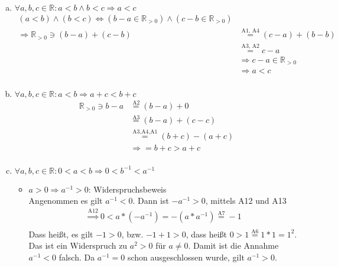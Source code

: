 \documentclass{article}
\begin{document}
\begin{enumerate}[(a)]
\item $\forall a,b,c \in \mathbb{R} \colon a < b \land b < c \Rightarrow a < c$ \\
  \begin{align*}
    (a < b) \land (b < c) \iff (b - a \in \mathbb{R}_{>0}) \land (c - b \in \mathbb{R}_{>0}) \\
    \Rightarrow \mathbb{R}_{>0} \ni (b - a) + (c - b) & \overset{\text{A1, A4}}= (c - a) + (b - b) \\
                                                      &  \overset{\text{A3, A2}}= c - a \\
                                                      & \Rightarrow c - a \in \mathbb{R}_{>0} \\
                                                      & \Rightarrow a < c\\
  \end{align*}
\item $\forall a,b,c \in \mathbb{R} \colon a < b \Rightarrow a + c < b + c$ \\
  \begin{align*}
    \mathbb{R}_{>0} \ni b - a &\overset{\text{A2}}= (b - a) + 0 \\
                              &\overset{\text{A3}}= (b - a) + (c - c) \\ 
                              &\overset{\text{A3,A4,A1}}= (b + c) - (a + c) \\
                              &\Rightarrow= b + c > a + c \\
  \end{align*}
\item $\forall a,b,c \in \mathbb{R} \colon 0 < a < b \Rightarrow 0 < b^{-1} < a^{-1}$ \\
  \begin{itemize}
  \item $a > 0 \Rightarrow a^{-1} > 0$: Widerspruchsbeweis \\
    Angenommen es gilt $a^{-1} < 0$. Dann ist $-a^{-1} > 0$, mittels A12 und A13
    \begin{align*}
      \overset{\text{A12}}\Rightarrow 0 < a * (-a^{-1}) = -(a * a^{-1}) \overset{\text{A7}}= -1 \\
    \end{align*}
    Dass heißt, es gilt $-1 > 0$, bzw. $-1 + 1 > 0$, dass heißt $0 > 1 \overset{\text{A6}}= 1 * 1 = 1^2$.
    Das ist ein Widerspruch zu $a^2 > 0$ für $a \ne 0$.
    Damit ist die Annahme $a^{-1} < 0$ falsch. Da $a^{-1} = 0$ schon ausgeschlossen wurde, gilt $a^{-1} > 0$.  

\end{itemize}
\end{enumerate}
\end{document}
